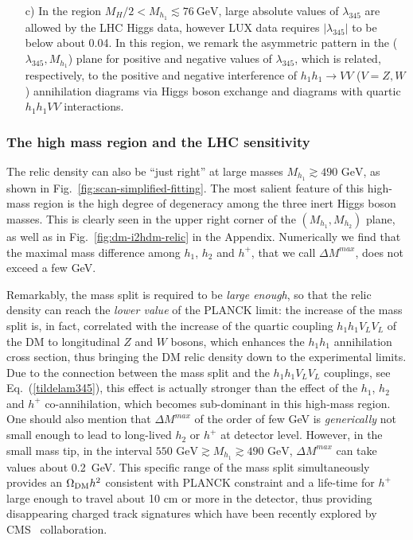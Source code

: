 \documentclass[12pt,a4paper]{article}
\begin{document}
\begin{itemize}
\item[c)] In the region $M_H/2<  M_{h_1} \lesssim 76~\mbox{GeV}$,  
large absolute values of  $\lambda_{345}$ are allowed by the LHC Higgs data, however LUX data requires $|\lambda_{345}|$ to be below about 0.04.
In this region, we remark the asymmetric pattern in the ($\lambda_{345},M_{h_1}$) plane
for positive and negative values of $\lambda_{345}$, which is related, respectively, to the 
positive and negative interference of  $h_1 h_1 \to VV$ ($V=Z,W$) annihilation diagrams via Higgs boson exchange
and diagrams with quartic $h_1 h_1 V V$  interactions. 
\end{itemize}

\subsubsection{The high mass region and the LHC sensitivity}


The relic density can also be ``just right'' at large masses $M_{h_1}\gtrsim 490\mbox{ GeV}$, as shown in Fig.~\ref{fig:scan-simplified-fitting}. 
The most salient feature of this high-mass region is the high degree of degeneracy among the three inert Higgs boson masses.
This is clearly seen in the upper right corner of the $(M_{h_1},M_{h_2})$ plane, as well as in
Fig.~\ref{fig:dm-i2hdm-relic} in the Appendix. Numerically we find that the
maximal mass difference among $h_1$, $h_2$ and $h^+$, that we call $\Delta M^{max}$, does not exceed a few GeV. 

Remarkably, the mass split is required to be {\it large enough}, so that the relic density can reach the {\it lower value} of the PLANCK limit: the increase of  the mass
split is, in fact, correlated with the increase of the quartic coupling $h_1 h_1 V_L V_L$ of the DM to longitudinal $Z$ and $W$ bosons,
which enhances the $h_1 h_1$ annihilation cross section, thus bringing
the DM relic density down to  the experimental limits. Due to the connection between the mass split and the $h_1 h_1 V_L V_L$ couplings, 
see Eq.~(\ref{tildelam345}),
this effect is actually stronger than the effect of the
$h_1$, $h_2$ and $h^+$ co-annihilation, which becomes sub-dominant in this high-mass region.
One should also mention that  $\Delta M^{max}$ of the order of few GeV  is {\it generically} not 
small enough to lead to long-lived $h_2$ or $h^+$ at detector level.
However, in the small mass tip, in the interval
$550\mbox{ GeV} \gtrsim M_{h_1}\gtrsim 490\mbox{ GeV}$,  $\Delta M^{max}$ can take values 
about 0.2~GeV. This specific range of the mass split simultaneously provides an $\Omega_{\rm DM} h^2$ consistent with 
PLANCK constraint and a life-time for $h^+$ large enough to travel  about 10 cm or more in the  detector, thus
providing disappearing charged track signatures which have been recently explored  by  CMS~\cite{CMS:2014gxa}
collaboration.
\end{document}
